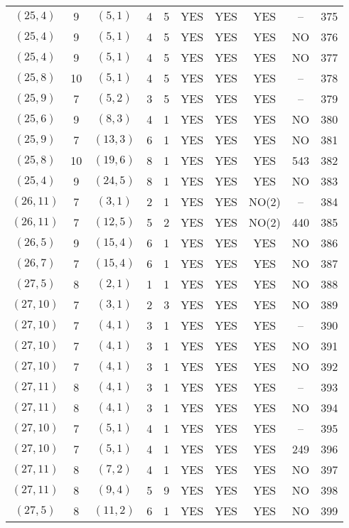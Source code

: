 \begin{longtable}{|c|c|c|c|c|c|c|c|c|c|}
$(25, 4)$ & 9 & $(5, 1)$ & 4 & 5 & YES & YES & YES & -- & 375\\
$(25, 4)$ & 9 & $(5, 1)$ & 4 & 5 & YES & YES & YES & NO & 376\\
$(25, 4)$ & 9 & $(5, 1)$ & 4 & 5 & YES & YES & YES & NO & 377\\
$(25, 8)$ & 10 & $(5, 1)$ & 4 & 5 & YES & YES & YES & -- & 378\\
$(25, 9)$ & 7 & $(5, 2)$ & 3 & 5 & YES & YES & YES & -- & 379\\
$(25, 6)$ & 9 & $(8, 3)$ & 4 & 1 & YES & YES & YES & NO & 380\\
$(25, 9)$ & 7 & $(13, 3)$ & 6 & 1 & YES & YES & YES & NO & 381\\
$(25, 8)$ & 10 & $(19, 6)$ & 8 & 1 & YES & YES & YES & 543 & 382\\
$(25, 4)$ & 9 & $(24, 5)$ & 8 & 1 & YES & YES & YES & NO & 383\\
$(26, 11)$ & 7 & $(3, 1)$ & 2 & 1 & YES & YES & NO(2) & -- & 384\\
$(26, 11)$ & 7 & $(12, 5)$ & 5 & 2 & YES & YES & NO(2) & 440 & 385\\
$(26, 5)$ & 9 & $(15, 4)$ & 6 & 1 & YES & YES & YES & NO & 386\\
$(26, 7)$ & 7 & $(15, 4)$ & 6 & 1 & YES & YES & YES & NO & 387\\
$(27, 5)$ & 8 & $(2, 1)$ & 1 & 1 & YES & YES & YES & NO & 388\\
$(27, 10)$ & 7 & $(3, 1)$ & 2 & 3 & YES & YES & YES & NO & 389\\
$(27, 10)$ & 7 & $(4, 1)$ & 3 & 1 & YES & YES & YES & -- & 390\\
$(27, 10)$ & 7 & $(4, 1)$ & 3 & 1 & YES & YES & YES & NO & 391\\
$(27, 10)$ & 7 & $(4, 1)$ & 3 & 1 & YES & YES & YES & NO & 392\\
$(27, 11)$ & 8 & $(4, 1)$ & 3 & 1 & YES & YES & YES & -- & 393\\
$(27, 11)$ & 8 & $(4, 1)$ & 3 & 1 & YES & YES & YES & NO & 394\\
$(27, 10)$ & 7 & $(5, 1)$ & 4 & 1 & YES & YES & YES & -- & 395\\
$(27, 10)$ & 7 & $(5, 1)$ & 4 & 1 & YES & YES & YES & 249 & 396\\
$(27, 11)$ & 8 & $(7, 2)$ & 4 & 1 & YES & YES & YES & NO & 397\\
$(27, 11)$ & 8 & $(9, 4)$ & 5 & 9 & YES & YES & YES & NO & 398\\
$(27, 5)$ & 8 & $(11, 2)$ & 6 & 1 & YES & YES & YES & NO & 399\\

\end{longtable}
